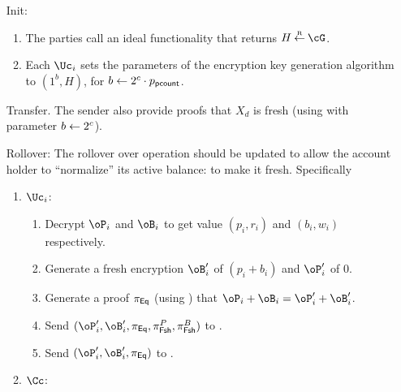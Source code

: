 \begin{enumerate}
	
	\item[Init:] 
	\begin{enumerate}
		\item The parties  call an ideal functionality that returns $H \getsr \cG$.
		  
		\item 	Each $\Uc_i$ sets the parameters of the encryption key generation algorithm to $(1^b,H)$, for  $b \leftarrow 2^{c}\cdot p_{\mathsf{pcount}}$.

	\end{enumerate}
 
	\item[Transfer.]  The sender also provide proofs that $X_d$ is fresh (\ie using \pZK{\rtFsh} with parameter $b\leftarrow 2^c$).
	
	
	\item[Rollover:] The rollover over operation should be updated to allow the account holder to ``normalize''  its active balance: to make it fresh. Specifically
	
	\begin{enumerate}
		\item $\Uc_i$:
		
		\begin{enumerate}
			\item Decrypt $\oP_i$ and $\oB_i$ to get value $(p_i,r_i)$ and $(b_i,w_i)$ respectively.
			
			
			\item Generate a fresh  encryption $\oB_i'$ of $(p_i +b_i )$ and $\oP_i'$ of $0$.
			
			\item Generate a proof $\pi_{\sf Eq}$ (\ie using \pZK{\rEq})   that $\oP_i+\oB_i = \oP_i'+ \oB_i'$.
			
			
			
			\item Send $(\oP_i',\oB_i',\pi_\Eqs,\pi^P_\FshS,\pi^B_\FshS)$ to \Cc.
			\item Send $(\oP_i',\oB_i',\pi_\Eqs)$ to \Cc.
		
		
		\end{enumerate}
		
		\item $\Cc$:
			\begin{enumerate}
				

\end{enumerate}
\end{enumerate}
\end{enumerate}
